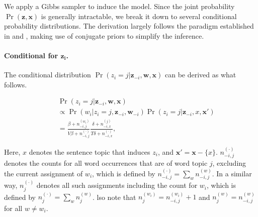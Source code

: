We apply a Gibbs sampler to induce the model.  Since the joint probability
$\Pr(\mathbf{z}, \mathbf{x})$ is generally intractable, we break it down to
several conditional probability distributions.  The derivation largely follows
the paradigm established in \cite{blei2003latent} and
\cite{griffiths2004finding}, making use of conjugate priors to simplify the
inference.

\paragraph{Conditional for $\mathbf{z_i}$.}  The conditional distribution $\Pr(z_i
= j|\mathbf{z}_{-i}, \mathbf{w}, \mathbf{x})$ can be derived as what follows.
\begin{small}
\begin{eqnarray*}
  && \Pr(z_i = j|\mathbf{z}_{-i}, \mathbf{w}, \mathbf{x}) \nonumber\\
  && \propto \Pr(w_i|z_i = j, \mathbf{z}_{-i}, \mathbf{w}_{-i}) \Pr(z_i = j|\mathbf{z}_{-i}, x, \mathbf{x}') \nonumber \\
  && = \frac{\beta + n_{-i,j}^{(w_i)}}{V \beta + n_{-i,j}^{(\cdot)}} \frac{\delta + n_{-i,x}^{(j)}}{T \delta + n_{-i,x}^{(\cdot)}}, \label{z_i:2.3}
\end{eqnarray*}
\end{small}

Here, $x$ denotes the sentence topic that induces $z_i$, and $\mathbf{x}' =
\mathbf{x} - \{ x \}$.  $n_{-i,j}^{(\cdot)}$ denotes the counts for all word
occurrences that are of word topic $j$, excluding the current assignment of
$w_i$, which is defined by $n_{-i,j}^{(\cdot)} = \sum_w n_{-i,j}^{(w)}$.  In a
similar way, $n_j^{(\cdot)}$ denotes all such assignments including the count
for $w_i$, which is defined by $n_j^{(\cdot)} = \sum_w n_j^{(w)}$.  lso note
  that $n_j^{(w_i)} = n_{-i,j}^{(w_i)} + 1$ and $n_j^{(w)} = n_{-i,j}^{(w)}$
  for all $w \ne w_i$.


